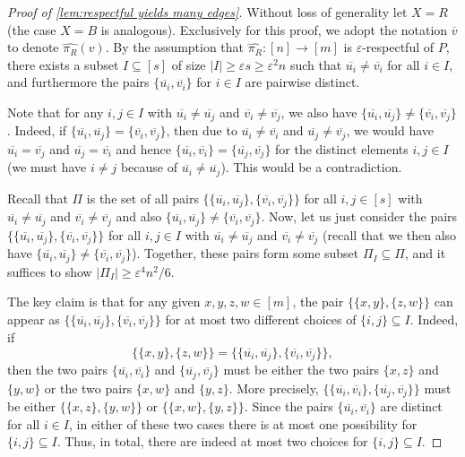 \documentclass[10pt,a4paper]{amsart}
\newcommand{\eps}{\varepsilon}
\newcommand\ol[1]{\overline{#1}}
\newcommand{\su}{\subseteq}
\newcommand\wh[1]{\widehat{#1}}
\begin{document}
\begin{proof}[Proof of \cref{lem:respectful yields many edges}] Without loss of generality let $X=R$ (the case $X=B$ is analogous). Exclusively for this proof, we adopt the notation $\ol v$ to denote $\wh{\pi_R}(v)$. By the assumption that $\wh{\pi_R}:[n] \to [m]$ is $\varepsilon$-respectful of $P$, there exists a subset $I\su [s]$ of size $|I|\geq \eps s\geq \eps^2n$ 
such that $\ol{u_i} \neq \ol{v_i}$ for all $i \in I$, and furthermore the pairs $\{\ol{u_i},\ol{v_i}\}$ for $ i\in I$ are pairwise distinct. 

Note that for any $i,j\in I$ with $\ol{u_i}\ne\ol{u_j}$ and $\ol{v_i}\ne\ol{v_j}$, we also have
$\{\ol{u_i},\ol{u_j}\}\ne \{\ol{v_i},\ol{v_j}\}$.
Indeed, if $\{\ol{u_i},\ol{u_j}\}= \{\ol{v_i},\ol{v_j}\}$, then due to
$\ol{u_i}\ne \ol{v_i}$ and $\ol{u_j}\ne\ol{v_j}$, we would have
$\ol{u_i}=\ol{v_j}$ and $\ol{u_j}=\ol{v_i}$ and hence
$\{\ol{u_i},\ol{v_i}\}=\{\ol{u_j},\ol{v_j}\}$
for the distinct elements $i,j\in I$
(we must have $i\ne j$ because of $\ol{u_i}\ne\ol{u_j}$).
This would be a contradiction.

Recall that $\Pi$ is the set of all pairs $\big\{\{\ol{u_i},\ol{u_j}\}, \{\ol{v_i},\ol{v_j}\}\big\}$ for all $i,j\in [s]$ with $\ol{u_i}\ne \ol{u_j}$ and $\ol{v_i}\ne \ol{v_j}$ and also $\{\ol{u_i},\ol{u_j}\}\ne \{\ol{v_i},\ol{v_j}\}$. Now, let us just consider the pairs
$\{\{\ol{u_i},\ol{u_j}\}, \{\ol{v_i},\ol{v_j}\}\}$
for all $i,j\in I$ with $\ol{u_i}\ne\ol{u_j}$ and $\ol{v_i}\ne\ol{v_j}$ (recall that we then also have $\{\ol{u_i},\ol{u_j}\}\ne \{\ol{v_i},\ol{v_j}\}$). Together, these pairs form some subset $\Pi_I\su \Pi$,
and it suffices to show $|\Pi_I|\geq \eps^4 n^2/6$.

The key claim is that for any given $x,y,z,w\in [m]$, the pair
$\{\{x,y\}, \{z,w\}\}$
can appear as
$\{\{\ol{u_i},\ol{u_j}\}, \{\ol{v_i},\ol{v_j}\}\}$
for at most two different choices of $\{i,j\}\su I$.
Indeed, if
\[
\big\{\{x,y\}, \{z,w\}\big\}
=
\big\{\{\ol{u_i},\ol{u_j}\}, \{\ol{v_i},\ol{v_j}\}\big\},
\]
then the two pairs $\{\ol{u_i},\ol{v_i}\}$ and $\{\ol{u_j},\ol{v_j}\}$
must be either the two pairs $\{x,z\}$ and $\{y,w\}$ or the two pairs
$\{x,w\}$ and $\{y,z\}$.
More precisely,
$\{\{\ol{u_i},\ol{v_i}\}, \{\ol{u_j},\ol{v_j}\}\}$
must be either $\{\{x,z\}, \{y,w\}\}$ or $\{\{x,w\}, \{y,z\}
\}$.
Since the pairs $\{\ol{u_i},\ol{v_i}\}$ are distinct for all $i\in I$,
in either of these two cases there is at most one possibility for
$\{i,j\}\su I$.
Thus, in total, there are indeed at most two choices for $\{i,j\}\su I$.


\end{proof}
\end{document}
